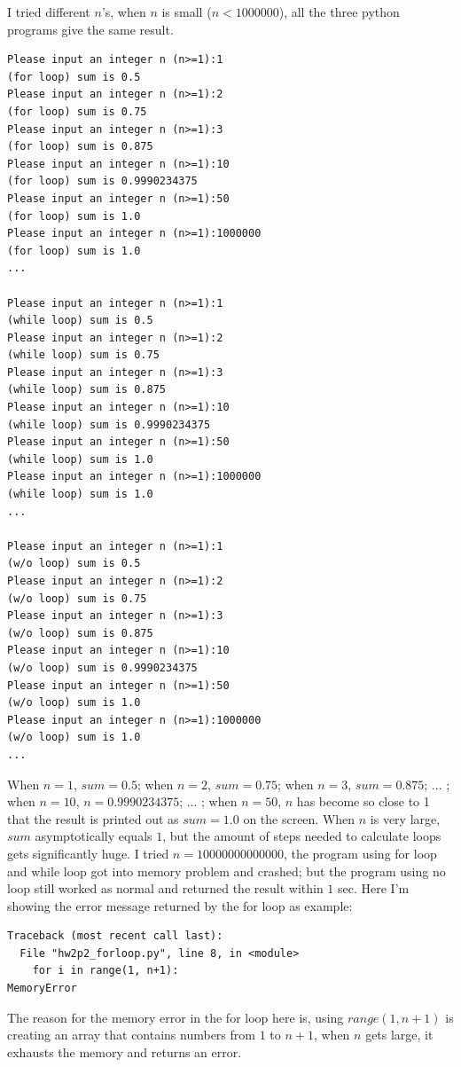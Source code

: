 I tried different $n$'s, when $n$ is small ($n < 1000000$), all the three python programs give the same result. 
\begin{verbatim}
Please input an integer n (n>=1):1
(for loop) sum is 0.5
Please input an integer n (n>=1):2
(for loop) sum is 0.75
Please input an integer n (n>=1):3
(for loop) sum is 0.875
Please input an integer n (n>=1):10
(for loop) sum is 0.9990234375
Please input an integer n (n>=1):50
(for loop) sum is 1.0
Please input an integer n (n>=1):1000000
(for loop) sum is 1.0
...

Please input an integer n (n>=1):1
(while loop) sum is 0.5
Please input an integer n (n>=1):2
(while loop) sum is 0.75
Please input an integer n (n>=1):3
(while loop) sum is 0.875
Please input an integer n (n>=1):10
(while loop) sum is 0.9990234375
Please input an integer n (n>=1):50
(while loop) sum is 1.0
Please input an integer n (n>=1):1000000
(while loop) sum is 1.0
...

Please input an integer n (n>=1):1
(w/o loop) sum is 0.5
Please input an integer n (n>=1):2
(w/o loop) sum is 0.75
Please input an integer n (n>=1):3
(w/o loop) sum is 0.875
Please input an integer n (n>=1):10
(w/o loop) sum is 0.9990234375
Please input an integer n (n>=1):50
(w/o loop) sum is 1.0
Please input an integer n (n>=1):1000000
(w/o loop) sum is 1.0
...
\end{verbatim}


When $n = 1$, $sum = 0.5$; when $n = 2$, $sum = 0.75$; when $n = 3$, $sum = 0.875$; ... ; when $n = 10$, $n = 0.9990234375$; ... ; when $n = 50$, $n$ has become so close to 1 that the result is printed out as $sum = 1.0$ on the screen. When $n$ is very large, $sum$ asymptotically equals $1$, but the amount of steps needed to calculate loops gets significantly huge. I tried $n = 10000000000000$, the program using for loop and while loop got into memory problem and crashed; but the program using no loop still worked as normal and returned the result within $1$ sec. Here I'm showing the error message returned by the for loop as example: 

\begin{verbatim}
Traceback (most recent call last):
  File "hw2p2_forloop.py", line 8, in <module>
    for i in range(1, n+1):
MemoryError
\end{verbatim}

The reason for the memory error in the for loop here is, using $range(1, n + 1)$ is creating an array that contains numbers from $1$ to $n + 1$, when $n$ gets large, it exhausts the memory and returns an error. \\ 

